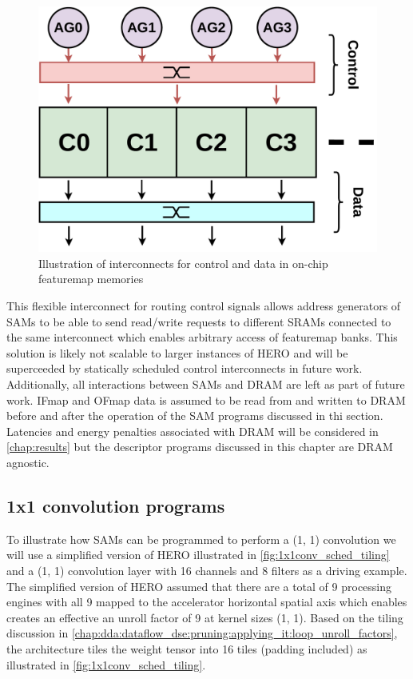 \begin{figure}[ht]
    \centering
    \includegraphics[scale=0.3]{fig/interconnect.pdf}
    \caption{Illustration of interconnects for control and data in on-chip featuremap memories}
    \label{fig:interconnect}
\end{figure}


This flexible interconnect for routing control signals
allows address generators of SAMs to be able to send read/write requests to
different SRAMs connected to the same interconnect which enables arbitrary
access of featuremap banks. This solution is likely not scalable to larger
instances of HERO and will be superceeded by statically scheduled control
interconnects in future work. 
Additionally, all interactions between SAMs and DRAM are left as part of future
work. IFmap and OFmap data is assumed to be read from and written to DRAM before
and after the operation of the SAM programs discussed in thi section. Latencies
and energy penalties associated with DRAM will be considered in
\autoref{chap:results} but the descriptor programs discussed in this chapter are
DRAM agnostic.

\subsection{1x1 convolution programs}
\label{chap:sams:acc_scheduling:1x1}


To illustrate how SAMs can be programmed to perform a (1, 1) convolution we will
use a simplified version of HERO illustrated in \autoref{fig:1x1conv_sched_tiling} and a (1, 1) convolution
layer with 16 channels and 8 filters as a driving example. The simplified
version of HERO assumed that there are a total of 9 processing engines with all 9
mapped to the accelerator horizontal spatial axis which enables creates an
effective an unroll factor of 9 at kernel sizes (1, 1). Based on the tiling
discussion in
\autoref{chap:dda:dataflow_dse:pruning:applying_it:loop_unroll_factors}, the
architecture tiles the weight tensor into 16 tiles (padding included) as
illustrated in \autoref{fig:1x1conv_sched_tiling}.

